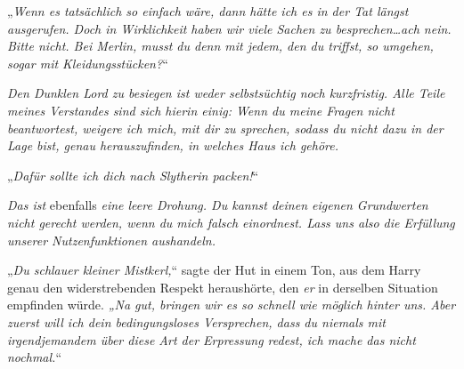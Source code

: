 „\emph{Wenn es tatsächlich so einfach wäre, dann hätte ich es in der Tat längst ausgerufen. Doch in Wirklichkeit haben wir viele Sachen zu besprechen…ach nein. Bitte nicht. Bei Merlin, \emph{musst} du denn mit jedem, den du triffst, so umgehen, sogar mit Kleidungsstücken?}“

\emph{Den Dunklen Lord zu besiegen ist weder selbstsüchtig noch kurzfristig. Alle Teile meines Verstandes sind sich hierin einig: Wenn du meine Fragen nicht beantwortest, weigere ich mich, mit dir zu sprechen, sodass du nicht dazu in der Lage bist, genau herauszufinden, in welches Haus ich gehöre. }

„\emph{Dafür sollte ich dich nach Slytherin packen!}“

\emph{Das ist} ebenfalls \emph{eine leere Drohung. Du kannst deinen eigenen Grundwerten nicht gerecht werden, wenn du mich falsch einordnest. Lass uns also die Erfüllung unserer Nutzenfunktionen aushandeln.}

„\emph{Du schlauer kleiner Mistkerl,}“ sagte der Hut in einem Ton, aus dem Harry genau den widerstrebenden Respekt heraushörte, den \emph{er} in derselben Situation empfinden würde. \emph{„Na gut, bringen wir es so schnell wie möglich hinter uns. Aber zuerst will ich dein bedingungsloses Versprechen, dass du niemals mit irgendjemandem über diese Art der Erpressung redest, ich mache das nicht nochmal.}“

